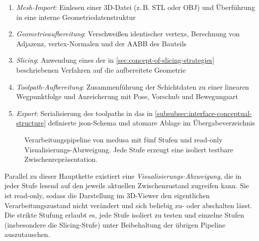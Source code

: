                \begin{enumerate}
                    \item \emph{Mesh-Import}: Einlesen einer 3D-Datei (z.\,B. STL oder OBJ) und Überführung in eine interne Geometriedatenstruktur
                    \item \emph{Geometrieaufbereitung}: Verschweißen identischer \glspl{vertex}, Berechnung von Adjazenz, \gls{vertex}-Normalen und der \ac{AABB} des Bauteils
                    \item \emph{Slicing}: Anwendung eines der in \cref{sec:concept-of-slicing-strategies} beschriebenen Verfahren auf die aufbereitete Geometrie
                    \item \emph{Toolpath-Aufbereitung}: Zusammenführung der Schichtdaten zu einer linearen Wegpunktfolge und Anreicherung mit Pose, Vorschub und Bewegungsart
                    \item \emph{Export}: Serialisierung des \glspl{toolpath} in das in \cref{subsubsec:interface-conceptual-structure} definierte \gls{json}-Schema und atomare Ablage im Übergabeverzeichnis
                \end{enumerate}

                \begin{figure}[ht]
                    \centering
                    \resizebox{\linewidth}{!}{
                        
                    }
                    \caption[Verarbeitungspipeline von MEDUSA]{
                        Verarbeitungspipeline von \ac{medusa} mit fünf Stufen und read-only Visualisierungs-Abzweigung.
                        Jede Stufe erzeugt eine isoliert testbare Zwischenrepräsentation.
                    }
                    \label{fig:concept-medusa-pipeline}
                \end{figure}

                Parallel zu dieser Hauptkette existiert eine \emph{Visualisierungs-Abzweigung}, die in jeder Stufe lesend auf den jeweils aktuellen Zwischenzustand zugreifen kann.
                Sie ist read-only, sodass die Darstellung im 3D-Viewer den eigentlichen Verarbeitungszustand nicht verändert und sich beliebig zu- oder abschalten lässt.
                Die strikte Stufung erlaubt es, jede Stufe isoliert zu testen und einzelne Stufen (insbesondere die Slicing-Stufe) unter Beibehaltung der übrigen Pipeline auszutauschen.

